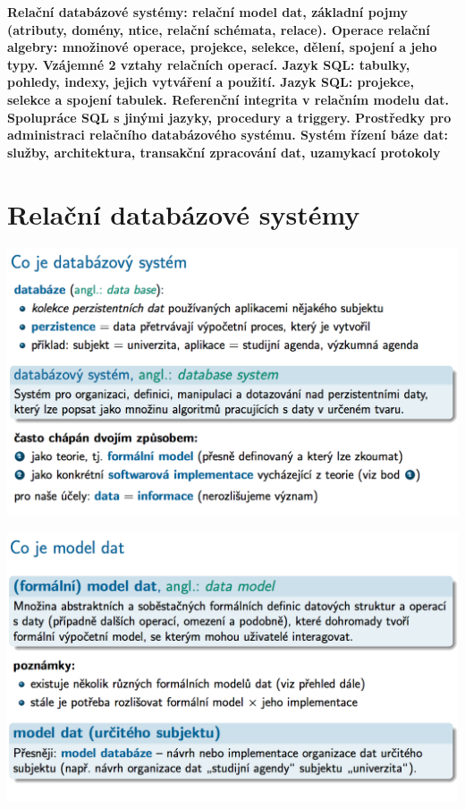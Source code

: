 \documentclass[10pt,a4paper]{article}
\begin{document}
\newpage

\textbf{Relační databázové systémy: relační model dat, základní pojmy (atributy, domény, ntice, relační schémata,
relace). Operace relační algebry: množinové operace, projekce, selekce, dělení, spojení a jeho typy. Vzájemné
2
vztahy relačních operací. Jazyk SQL: tabulky, pohledy, indexy, jejich vytváření a použití. Jazyk SQL: projekce,
selekce a spojení tabulek. Referenční integrita v relačním modelu dat. Spolupráce SQL s jinými jazyky, procedury
a triggery. Prostředky pro administraci relačního databázového systému. Systém řízení báze dat: služby,
architektura, transakční zpracování dat, uzamykací protokoly}

\section{Relační databázové systémy}
	\includegraphics[scale=0.4]{img/1}
	
	\includegraphics[scale=0.4]{img/2}
	
\end{document}
